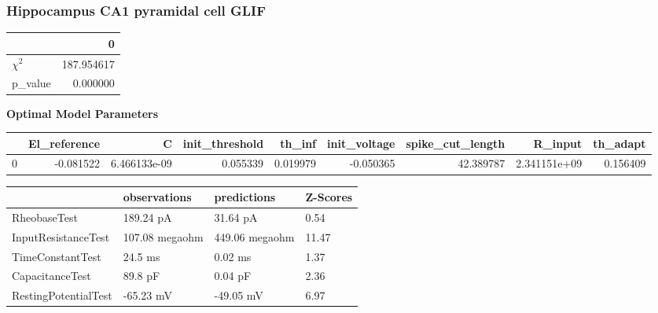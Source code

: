 \subsubsection{Hippocampus CA1 pyramidal cell GLIF}\begin{tabular}{lr}
\toprule
{} &           0 \\
\midrule
$\chi^{2}$ &  187.954617 \\
p\_value    &    0.000000 \\
\bottomrule
\end{tabular}
\textbf{Optimal Model Parameters} \begin{tabular}{lrrrrrrrr}
\toprule
{} &  El\_reference &             C &  init\_threshold &    th\_inf &  init\_voltage &  spike\_cut\_length &       R\_input &  th\_adapt \\
\midrule
0 &     -0.081522 &  6.466133e-09 &        0.055339 &  0.019979 &     -0.050365 &         42.389787 &  2.341151e+09 &  0.156409 \\
\bottomrule
\end{tabular}
\begin{tabular}{llll}
\toprule
{} &    observations &     predictions & Z-Scores \\
\midrule
RheobaseTest         &       189.24 pA &        31.64 pA &     0.54 \\
InputResistanceTest  &  107.08 megaohm &  449.06 megaohm &    11.47 \\
TimeConstantTest     &         24.5 ms &         0.02 ms &     1.37 \\
CapacitanceTest      &         89.8 pF &         0.04 pF &     2.36 \\
RestingPotentialTest &       -65.23 mV &       -49.05 mV &     6.97 \\
\bottomrule
\end{tabular}

